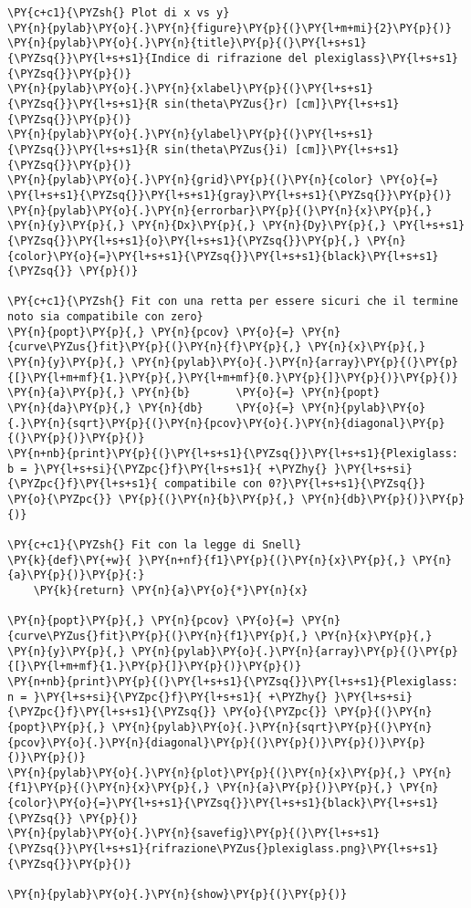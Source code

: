 \begin{Verbatim}[label=\makebox{\href{https://github.com/unipi-physics-labs/lab1-sheets/tree/main/snippy/refraction_index.py}{https://github.com/.../refraction\_index.py}},commandchars=\\\{\}]
\PY{c+c1}{\PYZsh{} Plot di x vs y}
\PY{n}{pylab}\PY{o}{.}\PY{n}{figure}\PY{p}{(}\PY{l+m+mi}{2}\PY{p}{)}
\PY{n}{pylab}\PY{o}{.}\PY{n}{title}\PY{p}{(}\PY{l+s+s1}{\PYZsq{}}\PY{l+s+s1}{Indice di rifrazione del plexiglass}\PY{l+s+s1}{\PYZsq{}}\PY{p}{)}
\PY{n}{pylab}\PY{o}{.}\PY{n}{xlabel}\PY{p}{(}\PY{l+s+s1}{\PYZsq{}}\PY{l+s+s1}{R sin(theta\PYZus{}r) [cm]}\PY{l+s+s1}{\PYZsq{}}\PY{p}{)} 
\PY{n}{pylab}\PY{o}{.}\PY{n}{ylabel}\PY{p}{(}\PY{l+s+s1}{\PYZsq{}}\PY{l+s+s1}{R sin(theta\PYZus{}i) [cm]}\PY{l+s+s1}{\PYZsq{}}\PY{p}{)} 
\PY{n}{pylab}\PY{o}{.}\PY{n}{grid}\PY{p}{(}\PY{n}{color} \PY{o}{=} \PY{l+s+s1}{\PYZsq{}}\PY{l+s+s1}{gray}\PY{l+s+s1}{\PYZsq{}}\PY{p}{)}
\PY{n}{pylab}\PY{o}{.}\PY{n}{errorbar}\PY{p}{(}\PY{n}{x}\PY{p}{,} \PY{n}{y}\PY{p}{,} \PY{n}{Dx}\PY{p}{,} \PY{n}{Dy}\PY{p}{,} \PY{l+s+s1}{\PYZsq{}}\PY{l+s+s1}{o}\PY{l+s+s1}{\PYZsq{}}\PY{p}{,} \PY{n}{color}\PY{o}{=}\PY{l+s+s1}{\PYZsq{}}\PY{l+s+s1}{black}\PY{l+s+s1}{\PYZsq{}} \PY{p}{)}

\PY{c+c1}{\PYZsh{} Fit con una retta per essere sicuri che il termine noto sia compatibile con zero}
\PY{n}{popt}\PY{p}{,} \PY{n}{pcov} \PY{o}{=} \PY{n}{curve\PYZus{}fit}\PY{p}{(}\PY{n}{f}\PY{p}{,} \PY{n}{x}\PY{p}{,} \PY{n}{y}\PY{p}{,} \PY{n}{pylab}\PY{o}{.}\PY{n}{array}\PY{p}{(}\PY{p}{[}\PY{l+m+mf}{1.}\PY{p}{,}\PY{l+m+mf}{0.}\PY{p}{]}\PY{p}{)}\PY{p}{)}
\PY{n}{a}\PY{p}{,} \PY{n}{b}       \PY{o}{=} \PY{n}{popt}
\PY{n}{da}\PY{p}{,} \PY{n}{db}     \PY{o}{=} \PY{n}{pylab}\PY{o}{.}\PY{n}{sqrt}\PY{p}{(}\PY{n}{pcov}\PY{o}{.}\PY{n}{diagonal}\PY{p}{(}\PY{p}{)}\PY{p}{)}
\PY{n+nb}{print}\PY{p}{(}\PY{l+s+s1}{\PYZsq{}}\PY{l+s+s1}{Plexiglass: b = }\PY{l+s+si}{\PYZpc{}f}\PY{l+s+s1}{ +\PYZhy{} }\PY{l+s+si}{\PYZpc{}f}\PY{l+s+s1}{ compatibile con 0?}\PY{l+s+s1}{\PYZsq{}} \PY{o}{\PYZpc{}} \PY{p}{(}\PY{n}{b}\PY{p}{,} \PY{n}{db}\PY{p}{)}\PY{p}{)}

\PY{c+c1}{\PYZsh{} Fit con la legge di Snell}
\PY{k}{def}\PY{+w}{ }\PY{n+nf}{f1}\PY{p}{(}\PY{n}{x}\PY{p}{,} \PY{n}{a}\PY{p}{)}\PY{p}{:}
    \PY{k}{return} \PY{n}{a}\PY{o}{*}\PY{n}{x}

\PY{n}{popt}\PY{p}{,} \PY{n}{pcov} \PY{o}{=} \PY{n}{curve\PYZus{}fit}\PY{p}{(}\PY{n}{f1}\PY{p}{,} \PY{n}{x}\PY{p}{,} \PY{n}{y}\PY{p}{,} \PY{n}{pylab}\PY{o}{.}\PY{n}{array}\PY{p}{(}\PY{p}{[}\PY{l+m+mf}{1.}\PY{p}{]}\PY{p}{)}\PY{p}{)}
\PY{n+nb}{print}\PY{p}{(}\PY{l+s+s1}{\PYZsq{}}\PY{l+s+s1}{Plexiglass: n = }\PY{l+s+si}{\PYZpc{}f}\PY{l+s+s1}{ +\PYZhy{} }\PY{l+s+si}{\PYZpc{}f}\PY{l+s+s1}{\PYZsq{}} \PY{o}{\PYZpc{}} \PY{p}{(}\PY{n}{popt}\PY{p}{,} \PY{n}{pylab}\PY{o}{.}\PY{n}{sqrt}\PY{p}{(}\PY{n}{pcov}\PY{o}{.}\PY{n}{diagonal}\PY{p}{(}\PY{p}{)}\PY{p}{)}\PY{p}{)}\PY{p}{)}
\PY{n}{pylab}\PY{o}{.}\PY{n}{plot}\PY{p}{(}\PY{n}{x}\PY{p}{,} \PY{n}{f1}\PY{p}{(}\PY{n}{x}\PY{p}{,} \PY{n}{a}\PY{p}{)}\PY{p}{,} \PY{n}{color}\PY{o}{=}\PY{l+s+s1}{\PYZsq{}}\PY{l+s+s1}{black}\PY{l+s+s1}{\PYZsq{}} \PY{p}{)}
\PY{n}{pylab}\PY{o}{.}\PY{n}{savefig}\PY{p}{(}\PY{l+s+s1}{\PYZsq{}}\PY{l+s+s1}{rifrazione\PYZus{}plexiglass.png}\PY{l+s+s1}{\PYZsq{}}\PY{p}{)}

\PY{n}{pylab}\PY{o}{.}\PY{n}{show}\PY{p}{(}\PY{p}{)}
\end{Verbatim}
